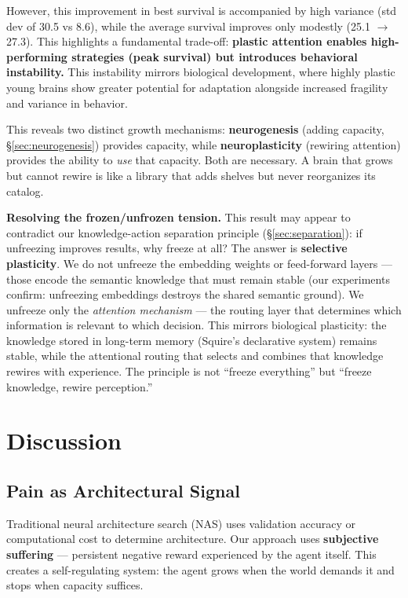 \documentclass{article}
\begin{document}
However, this improvement in best survival is accompanied by high variance (std dev of 30.5 vs 8.6), while the average survival improves only modestly (25.1 $\rightarrow$ 27.3). This highlights a fundamental trade-off: \textbf{plastic attention enables high-performing strategies (peak survival) but introduces behavioral instability.} This instability mirrors biological development, where highly plastic young brains show greater potential for adaptation alongside increased fragility and variance in behavior.

This reveals two distinct growth mechanisms: \textbf{neurogenesis} (adding capacity, \S\ref{sec:neurogenesis}) provides capacity, while \textbf{neuroplasticity} (rewiring attention) provides the ability to \textit{use} that capacity. Both are necessary. A brain that grows but cannot rewire is like a library that adds shelves but never reorganizes its catalog.

\textbf{Resolving the frozen/unfrozen tension.} This result may appear to contradict our knowledge-action separation principle (\S\ref{sec:separation}): if unfreezing improves results, why freeze at all? The answer is \textbf{selective plasticity}. We do not unfreeze the embedding weights or feed-forward layers --- those encode the semantic knowledge that must remain stable (our experiments confirm: unfreezing embeddings destroys the shared semantic ground). We unfreeze only the \textit{attention mechanism} --- the routing layer that determines which information is relevant to which decision. This mirrors biological plasticity: the knowledge stored in long-term memory (Squire's declarative system) remains stable, while the attentional routing that selects and combines that knowledge rewires with experience. The principle is not ``freeze everything'' but ``freeze knowledge, rewire perception.''

\section{Discussion}

\subsection{Pain as Architectural Signal}
Traditional neural architecture search (NAS) uses validation accuracy or computational cost to determine architecture. Our approach uses \textbf{subjective suffering} --- persistent negative reward experienced by the agent itself. This creates a self-regulating system: the agent grows when the world demands it and stops when capacity suffices.
\end{document}
